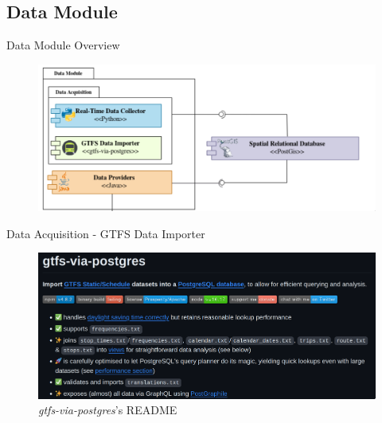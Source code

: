\documentclass[xcolor=dvipsnames,table]{beamer}
\begin{document}
\subsection{Data Module}
\begin{frame}{Data Module Overview}
        \begin{figure}[H]
                \centering
                \includegraphics[width=\textwidth]{images/datamodule.png}
        \end{figure}
\end{frame}


\begin{frame}{Data Acquisition - GTFS Data Importer}
        \begin{figure}
                \centering
                \includegraphics[width=\textwidth]{images/GTFS-via-postgres.png}
                \caption{\textit{gtfs-via-postgres}'s README}
        \end{figure}
\end{frame}
\end{document}
